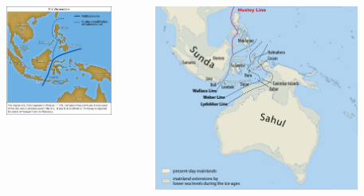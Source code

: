 \documentclass[10pt]{beamer}
\begin{document}
\begin{frame}
	\begin{columns}
		\begin{column}{0.5\textwidth}
			\begin{center}
				\includegraphics[width=0.8\textwidth]{figures/wallaces-line.jpg}
			\end{center}
		\end{column}
		
		\begin{column}{0.5\textwidth}
			\begin{center}
				\includegraphics[width=0.8\textwidth]{figures/wallaces-line2.png}
			\end{center}
		\end{column}
	\end{columns}
\end{frame}  
\end{document}
